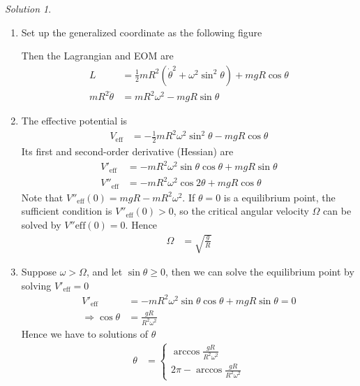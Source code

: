 \documentclass[twoside,11pt]{article}
\theoremstyle{definition}
\theoremstyle{remark}
\newtheorem*{solution}{Solution}
\begin{document}
\begin{solution}~
\begin{enumerate}[label=\arabic*)]
\item Set up the generalized coordinate as the following figure
\begin{figure}[H]
    \centering
    \def\r{1}
\end{figure}
Then the Lagrangian and EOM are
\begin{align*}
    L &= \frac{1}{2} mR^2(\dot\theta^2 + \omega^2\sin^2\theta) + mgR\cos\theta\\
    mR^2\ddot\theta &= mR^2\omega^2 - mgR\sin\theta
\end{align*}

\item The effective potential is
\begin{align*}
    V_\text{eff} &= -\frac{1}{2}mR^2\omega^2\sin^2\theta - mgR\cos\theta
\end{align*}
Its first and second-order derivative (Hessian) are
\begin{align*}
    V'_\text{eff}  &= -mR^2\omega^2\sin\theta\cos\theta + mgR\sin\theta\\
    V''_\text{eff} &= -mR^2\omega^2\cos2\theta + mgR\cos\theta
\end{align*}
Note that $V''_\text{eff}(0) = mgR - mR^2\omega^2$.
If $\theta=0$ is a equilibrium point, the sufficient condition is
$V''_\text{eff}(0) > 0$, so the critical angular velocity $\Omega$
can be solved by $V''\text{eff}(0) = 0$.
Hence
\begin{align*}
    \Omega &= \sqrt{\frac{g}{R}}
\end{align*}

\item Suppose $\omega>\Omega$, and let $\sin\theta\geq 0$, then
we can solve the equilibrium point by solving $V'_\text{eff}=0$
\begin{align*}
    V'_\text{eff} &= 
    -mR^2\omega^2\sin\theta\cos\theta + mgR\sin\theta = 0\\
    \Rightarrow 
    \cos\theta &= \frac{gR}{R^2\omega^2}
\end{align*}
Hence we have to solutions of $\theta$
\begin{align*}
    \theta &= \begin{cases}
        \arccos\frac{gR}{R^2\omega^2} \\
        2\pi - \arccos\frac{gR}{R^2\omega^2}
    \end{cases}
\end{align*}


\end{enumerate}
\end{solution}


\end{document}
